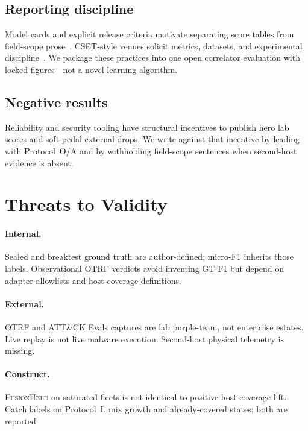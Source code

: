 \documentclass[conference,compsoc]{IEEEtran}
\newcounter{definition}
\begin{document}
\subsection{Reporting discipline}
Model cards and explicit release criteria motivate separating score tables from
field-scope prose~\cite{van_leeuwen_model_cards}.
CSET-style venues solicit metrics, datasets, and experimental
discipline~\cite{cset_charter}.
We package these practices into one open correlator evaluation with locked
figures---not a novel learning algorithm.

\subsection{Negative results}
Reliability and security tooling have structural incentives to publish hero
lab scores and soft-pedal external drops.
We write against that incentive by leading with Protocol~O/A and by withholding
field-scope sentences when second-host evidence is absent.

\section{Threats to Validity}
\label{sec:threats}

\paragraph{Internal.}
Sealed and breaktest ground truth are author-defined; micro-F1 inherits those
labels.
Observational OTRF verdicts avoid inventing GT F1 but depend on adapter
allowlists and host-coverage definitions.

\paragraph{External.}
OTRF and ATT\&CK Evals captures are lab purple-team, not enterprise estates.
Live replay is not live malware execution.
Second-host physical telemetry is missing.

\paragraph{Construct.}
\textsc{FusionHeld} on saturated fleets is not identical to positive
host-coverage lift.
Catch labels on Protocol~L mix growth and already-covered states; both are
reported.
\end{document}

